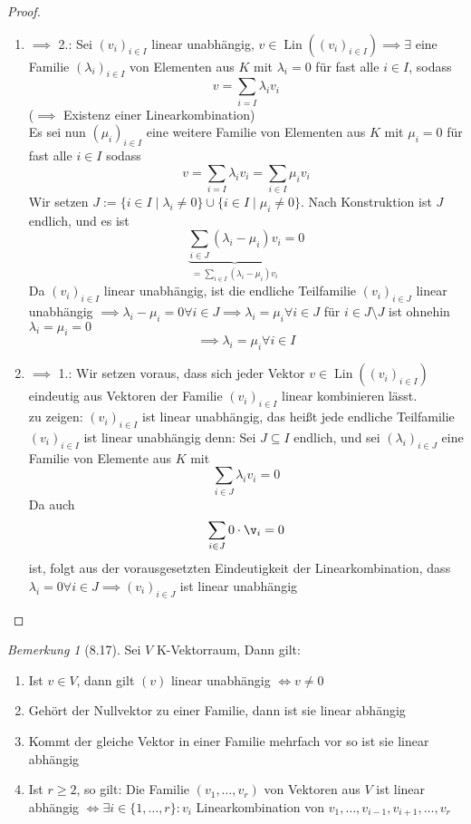 \documentclass[a4paper]{scrartcl}
\DeclareMathOperator{\Exists}{\exists}
\DeclareMathOperator{\Forall}{\forall}
\DeclareMathOperator{\Lin}{Lin}
\theoremstyle{definition}
\theoremstyle{plain}
\theoremstyle{plain}
\theoremstyle{remark}
\newtheorem{remark}{Bemerkung}
\theoremstyle{remark}
\theoremstyle{remark}
\theoremstyle{remark}
\theoremstyle{remark}
\begin{document}
\begin{proof}
\begin{enumerate}
\item $\implies$ 2.: Sei $(v_i)_{i\in I}$ linear unabhängig, $v\in \Lin((v_i)_{i\in I}) \implies \Exists$ eine Familie $(\lambda_i)_{i\in I}$ von Elementen aus $K$ mit
$\lambda_i = 0$ für fast alle $i\in I$, sodass
\[v = \sum_{i=I} \lambda_i v_i\]
($\implies$ Existenz einer Linearkombination) \\
     Es sei nun $(\mu_i)_{i\in I}$ eine weitere Familie von Elementen aus $K$ mit $\mu_i = 0$ für fast alle $i \in I$ sodass
\[v = \sum_{i = I} \lambda_i v_i = \sum_{i\in I} \mu_i v_i\]
Wir setzen $J:= \{i\in I \mid \lambda_i \neq 0\} \cup \{i \in I \mid \mu_i \neq 0\}$. Nach Konstruktion ist $J$ endlich, und es ist
\[\underbrace{\sum_{i\in J} (\lambda_i - \mu_i) v_i}_{=\sum_{i\in I} (\lambda_i - \mu_i) v_i} = 0\]
Da $(v_i)_{i\in I}$ linear unabhängig, ist die endliche Teilfamilie $(v_i)_{i\in J}$ linear unabhängig $\implies \lambda_i - \mu_i = 0 \Forall i\in J \implies \lambda_i = \mu_i \Forall i\in J$
für $i\in J\setminus J$ ist ohnehin $\lambda_i = \mu_i = 0$
\[\implies \lambda_i = \mu_i \Forall i\in I\]
\item $\implies$ 1.: Wir setzen voraus, dass sich jeder Vektor $v\in\Lin((v_i)_{i\in I})$ eindeutig aus Vektoren der Familie $(v_i)_{i\in I}$ linear kombinieren lässt. \\
     zu zeigen: $(v_i)_{i\in I}$ ist linear unabhängig, das heißt jede endliche Teilfamilie $(v_i)_{i\in I}$ ist linear unabhängig denn:
Sei $J \subseteq I$ endlich, und sei $(\lambda_i)_{i\in J}$ eine Familie von Elemente aus $K$ mit
\[\sum_{i\in J}\lambda_i v_i = 0\]
Da auch
\[\sum_{i\in J} 0 \cdot \v_i = 0\]
ist, folgt aus der vorausgesetzten Eindeutigkeit der Linearkombination, dass $\lambda_i = 0 \Forall i\in J \implies (v_i)_{i\in J}$ ist linear unabhängig
\end{enumerate}
\end{proof}
\begin{remark}[8.17]
Sei $V$ K-Vektorraum, Dann gilt:
\begin{enumerate}
\item Ist $v\in V$, dann gilt $(v)$ linear unabhängig $\iff v \neq 0$
\item Gehört der Nullvektor zu einer Familie, dann ist sie linear abhängig
\item Kommt der gleiche Vektor in einer Familie mehrfach vor so ist sie linear abhängig
\item Ist $r\geq 2$, so gilt: Die Familie $(v_1, \ldots, v_r)$ von Vektoren aus $V$ ist linear abhängig $\iff \Exists i \in \{1, \ldots, r\}: v_i$ Linearkombination von $v_1, \ldots, v_{i - 1}, v_{i + 1}, \ldots, v_r$
\end{enumerate}
\end{remark}
\end{document}
